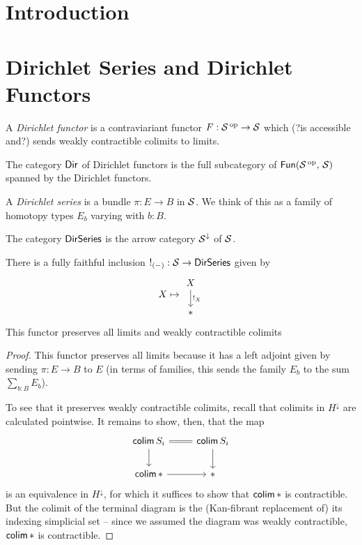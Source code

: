 \section{Introduction}


\section{Dirichlet Series and Dirichlet Functors}

\begin{defn}
A \emph{Dirichlet functor} is a contraviariant functor $F : \operatorname{\mathcal{S}}\operatorname{^\text{op}} \to \operatorname{\mathcal{S}}$
which (?is accessible and?) sends weakly contractible colimits to limits.

The category $\operatorname{\mathsf{{Dir}}}$ of Dirichlet functors is the full subcategory of
$\operatorname{\mathsf{{Fun}}}(\operatorname{\mathcal{S}}\operatorname{^\text{op}},\, \operatorname{\mathcal{S}})$ spanned by the Dirichlet functors.
\end{defn}

\begin{defn}
A \emph{Dirichlet series} is a bundle $\pi : E \to B$ in $\operatorname{\mathcal{S}}$. We think of this
as a family of homotopy types $E_b$ varying with $b : B$.

The category $\operatorname{\mathsf{{DirSeries}}}$ is the arrow category $\operatorname{\mathcal{S}}^{\downarrow}$ of $\operatorname{\mathcal{S}}$.
\end{defn}

\begin{prop}
  There is a fully faithful inclusion $\operatorname{!}_{(-)} : \operatorname{\mathcal{S}} \to \operatorname{\mathsf{{DirSeries}}}$ given by
  $$X \mapsto \begin{tikzcd} X \arrow[d, "!_X"] \\ \ast \end{tikzcd}$$
  This functor preserves all limits and weakly contractible colimits
\end{prop}
\begin{proof}
  This functor preserves all limits because it has a left adjoint given by sending $\pi : E \to B$ to $E$ (in terms of families, this sends the family $E_b$ to the sum $\sum_{b : B} E_b$). 
  
  To see that it preserves weakly contractible colimits, recall that colimits in $H^{\downarrow}$ are calculated pointwise. It remains to show, then, that the map
  \[
    \begin{tikzcd}
    \colim S_i \arrow[r, equals] \arrow[d] & \colim S_i \arrow[d] \\
    \colim \ast \arrow[r] & \ast 
    \end{tikzcd}
  \]
  is an equivalence in $H^{\downarrow}$, for which it suffices to show that $\operatorname{\mathsf{colim}} \ast$ is contractible. But the colimit of the terminal diagram is the (Kan-fibrant replacement of) its indexing simplicial set -- since we assumed the diagram was weakly contractible, $\operatorname{\mathsf{colim}} \ast$ is contractible.
\end{proof}

